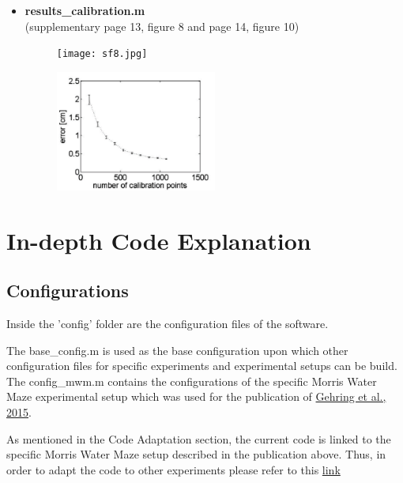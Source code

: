 \documentclass[12pt,titlepage]{article}
\begin{document}
\begin{doublespace}
\begin{itemize}
\item \textbf{results\_calibration.m}\\
(supplementary page 13, figure 8 and page 14, figure 10)
\begin{figure}[H]
	\begin{center}
		\texttt{[image: sf8.jpg]}\\
		\label{code_sfig8}
	\end{center}
\end{figure}
\begin{figure}[H]
	\begin{center}
		\includegraphics[width=0.5\textwidth]{sf10.jpg}\\
		\label{code_sfig10}
	\end{center}
\end{figure}

\end{itemize}


\section{In-depth Code Explanation}

\subsection{Configurations}
Inside the 'config' folder are the configuration files of the software.

The base\_config.m is used as the base configuration upon which other configuration files for specific experiments and experimental setups can be build. The config\_mwm.m contains the configurations of the specific Morris Water Maze experimental setup which was used for the publication of \href{http://www.nature.com/articles/srep14562}{Gehring et al., 2015}.

As mentioned in the Code Adaptation section, the current code is linked to the specific Morris Water Maze setup described in the publication above. Thus, in order to adapt the code to other experiments please refer to this \href{https://github.com/RodentDataAnalytics/roda}{link}


\end{doublespace}
\end{document}
